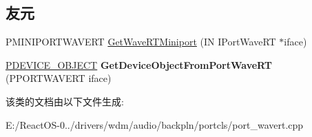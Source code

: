 \subsection*{友元}
\begin{DoxyCompactItemize}
\item 
\mbox{\label{class_c_port_wave_r_t_a04e664665302c31110648a1a3a0c5c0b}} 
P\+M\+I\+N\+I\+P\+O\+R\+T\+W\+A\+V\+E\+RT \hyperlink{class_c_port_wave_r_t_a04e664665302c31110648a1a3a0c5c0b}{Get\+Wave\+R\+T\+Miniport} (IN I\+Port\+Wave\+RT $\ast$iface)
\begin{DoxyCompactList}\small\item\em 

 \end{DoxyCompactList}\item 
\mbox{\label{class_c_port_wave_r_t_a7b35637a8ead88db35249f4155a38a83}} 
\hyperlink{struct___d_e_v_i_c_e___o_b_j_e_c_t}{P\+D\+E\+V\+I\+C\+E\+\_\+\+O\+B\+J\+E\+CT} {\bfseries Get\+Device\+Object\+From\+Port\+Wave\+RT} (P\+P\+O\+R\+T\+W\+A\+V\+E\+RT iface)
\end{DoxyCompactItemize}


该类的文档由以下文件生成\+:\begin{DoxyCompactItemize}
\item 
E\+:/\+React\+O\+S-\/0../drivers/wdm/audio/backpln/portcls/port\+\_\+wavert.\+cpp\end{DoxyCompactItemize}
